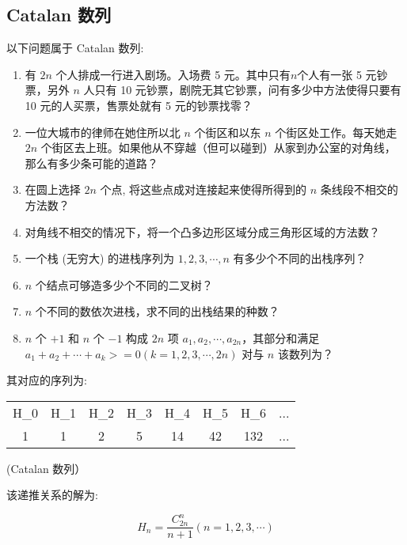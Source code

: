
\subsection{Catalan 数列}

以下问题属于 Catalan 数列:

\begin{enumerate}
\item 有 $2n$ 个人排成一行进入剧场。入场费 5 元。其中只有$n$个人有一张 5 元钞票，另外 $n$ 人只有 10 元钞票，剧院无其它钞票，问有多少中方法使得只要有 10 元的人买票，售票处就有 5 元的钞票找零？
\item 一位大城市的律师在她住所以北 $n$ 个街区和以东 $n$ 个街区处工作。每天她走 $2n$ 个街区去上班。如果他从不穿越（但可以碰到）从家到办公室的对角线，那么有多少条可能的道路？
\item 在圆上选择 $2n$ 个点, 将这些点成对连接起来使得所得到的 $n$ 条线段不相交的方法数？
\item 对角线不相交的情况下，将一个凸多边形区域分成三角形区域的方法数？
\item 一个栈 (无穷大) 的进栈序列为 $1,2,3, \cdots ,n$ 有多少个不同的出栈序列？
\item $n$ 个结点可够造多少个不同的二叉树？
\item $n$ 个不同的数依次进栈，求不同的出栈结果的种数？
\item $n$ 个 $+1$ 和 $n$ 个 $-1$ 构成 $2n$ 项 $a_1,a_2, \cdots ,a_{2n}$，其部分和满足 $a_1+a_2+ \cdots +a_k>=0(k=1,2,3, \cdots ,2n)$ 对与 $n$ 该数列为？
\end{enumerate}

其对应的序列为:

\begin{tabular}{cccccccc}
\hline
H\_0& H\_1& H\_2& H\_3& H\_4& H\_5& H\_6& ...\\1& 1& 2& 5& 14& 42& 132& ...\\\hline
\end{tabular}

(Catalan 数列）

该递推关系的解为:

$$
H_n=\frac{C_{2n}^{n}}{n+1}(n=1,2,3,\cdots)
$$
